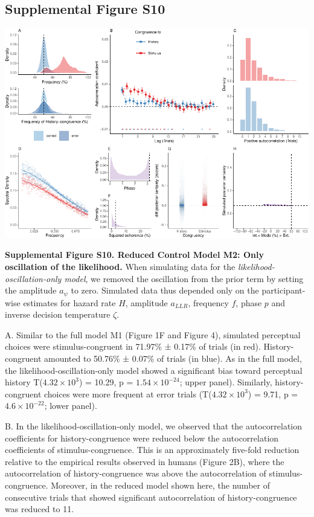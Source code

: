 \documentclass[
]{article}
\begin{document}
\newpage

\hypertarget{supplemental-figure-s10}{%
\subsection{Supplemental Figure S10}\label{supplemental-figure-s10}}

\includegraphics{modes_mouse_rev2_files/figure-latex/Supplemental_Figure_S10-1.pdf}

\textbf{Supplemental Figure S10. Reduced Control Model M2: Only
oscillation of the likelihood.} When simulating data for the
\emph{likelihood-oscillation-only model}, we removed the oscillation
from the prior term by setting the amplitude \(a_{\psi}\) to zero.
Simulated data thus depended only on the participant-wise estimates for
hazard rate \(H\), amplitude \(a_{LLR}\), frequency \(f\), phase \(p\)
and inverse decision temperature \(\zeta\).

A. Similar to the full model M1 (Figure 1F and Figure 4), simulated
perceptual choices were stimulus-congruent in 71.97\% ± 0.17\% of trials
(in red). History-congruent amounted to 50.76\% ± 0.07\% of trials (in
blue). As in the full model, the likelihood-oscillation-only model
showed a significant bias toward perceptual history
T(\ensuremath{4.32\times 10^{3}}) = 10.29, p =
\(\ensuremath{1.54\times 10^{-24}}\); upper panel). Similarly,
history-congruent choices were more frequent at error trials
(T(\ensuremath{4.32\times 10^{3}}) = 9.71, p =
\(\ensuremath{4.6\times 10^{-22}}\); lower panel).

B. In the likelihood-oscillation-only model, we observed that the
autocorrelation coefficients for history-congruence were reduced below
the autocorrelation coefficients of stimulus-congruence. This is an
approximately five-fold reduction relative to the empirical results
observed in humans (Figure 2B), where the autocorrelation of
history-congruence was above the autocorrelation of stimulus-congruence.
Moreover, in the reduced model shown here, the number of consecutive
trials that showed significant autocorrelation of history-congruence was
reduced to 11.
\end{document}
